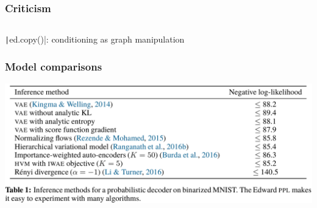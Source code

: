 \documentclass[10pt]{beamer}
\begin{document}
\begin{frame}
  \frametitle{Criticism}
  \begin{block}{}
    \inputminted[fontsize=\scriptsize]{python}{python/beta-bernoulli.py}
  \end{block}
  \texttt|ed.copy()|: conditioning as graph manipulation
\end{frame}


\begin{frame}
  \frametitle{Model comparisons}
  \includegraphics[width=\textwidth]{img/edward-lls.png}
\end{frame}
\end{document}

